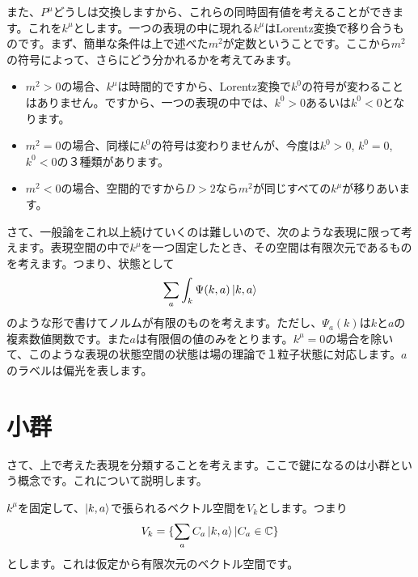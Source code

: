 \documentclass[report,paper=a4, fontsize=12pt, line_length=16cm, number_of_lines=34,dvipdfmx]{jlreq}
\numberwithin{equation}{chapter}
\numberwithin{equation}{section}
\newcommand{\Cb}{\mathbb{C}}
\begin{document}
また、$P^{\mu}$どうしは交換しますから、これらの同時固有値を考えることができます。これを$k^{\mu}$とします。一つの表現の中に現れる$k^{\mu}$はLorentz変換で移り合うものです。まず、簡単な条件は上で述べた$m^2$が定数ということです。ここから$m^2$の符号によって、さらにどう分かれるかを考えてみます。
\begin{itemize}
  \item $m^2>0$の場合、$k^{\mu}$は時間的ですから、Lorentz変換で$k^0$の符号が変わることはありません。ですから、一つの表現の中では、$k^0>0$あるいは$k^0<0$となります。
  \item $m^2=0$の場合、同様に$k^0$の符号は変わりませんが、今度は$k^0>0$, $k^0=0$, $k^0<0$の３種類があります。
  \item $m^2<0$の場合、空間的ですから$D>2$なら$m^2$が同じすべての$k^{\mu}$が移りあいます。
\end{itemize}

さて、一般論をこれ以上続けていくのは難しいので、次のような表現に限って考えます。表現空間の中で$k^{\mu}$を一つ固定したとき、その空間は有限次元であるものを考えます。つまり、状態として
\begin{align}
  \sum_{a}\int_{k}\Psi(k,a)\ket{k,a}
\end{align}
のような形で書けてノルムが有限のものを考えます。ただし、$\Psi_{a}(k)$は$k$と$a$の複素数値関数です。また$a$は有限個の値のみをとります。$k^{\mu}=0$の場合を除いて、このような表現の状態空間の状態は場の理論で１粒子状態に対応します。$a$のラベルは偏光を表します。

\section{小群}
さて、上で考えた表現を分類することを考えます。ここで鍵になるのは小群という概念です。これについて説明します。

$k^{\mu}$を固定して、$\ket{k,a}$で張られるベクトル空間を$V_{k}$とします。つまり
\begin{align}
  V_{k}=\{\sum_{a}C_{a}\ket{k,a} | C_{a}\in \Cb\}
\end{align}
とします。これは仮定から有限次元のベクトル空間です。
\end{document}
